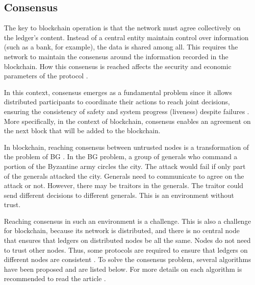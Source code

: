 \subsection{Consensus}\label{sec:consenso}
The key to blockchain operation is that the network must agree collectively on the ledger's content.  Instead of a central entity maintain control over information (such as a bank, for example), the data is shared among all. This requires the network to maintain the consensus around the information recorded in the blockchain. How this consensus is reached affects the security and economic parameters of the protocol \cite{kostarev2017review}.

In this context, consensus emerges as a fundamental problem since it allows distributed participants to coordinate their actions to reach joint decisions, ensuring the consistency of safety and system progress (liveness) despite failures \cite{greve2018blockchain}. More specifically, in the context of blockchain, consensus enables an agreement on the next block that will be added to the blockchain.

In blockchain, reaching consensus between untrusted nodes is a transformation of the problem of \ac{BG} \cite{lamport1982byzantine}. In the BG problem, a group of generals who command a portion of the Byzantine army circles the city. The attack would fail if only part of the generals attacked the city. Generals need to communicate to agree on the attack or not. However, there may be traitors in the generals. The traitor could send different decisions to different generals. This is an environment without trust.

Reaching consensus in such an environment is a challenge. This is also a challenge for blockchain, because its network is distributed, and there is no central node that ensures that ledgers on distributed nodes be all the same. Nodes do not need to trust other nodes. Thus, some protocols are required to ensure that ledgers on different nodes are consistent \cite{kostarev2017review}. To solve the consensus problem, several algorithms have been proposed and are listed below. For more details on each algorithm is recommended to read the article \cite{mingxiao2017review}.

